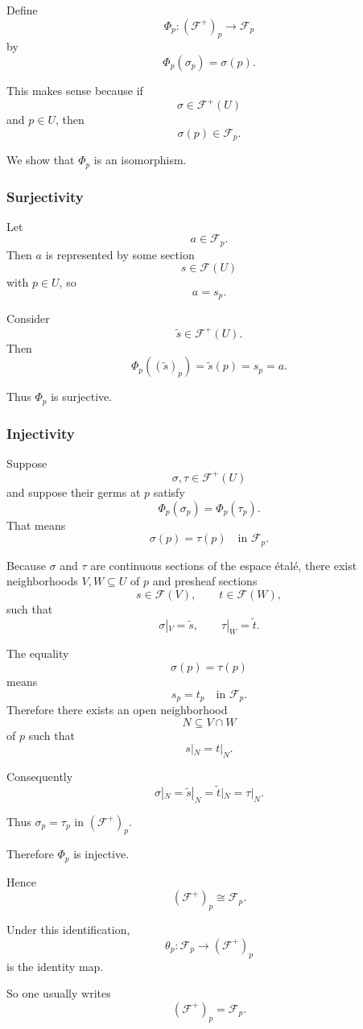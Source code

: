 \documentclass[12pt,a4paper]{article}
\begin{document}
Define
\[
\Phi_p : (\mathcal F^+)_p \longrightarrow \mathcal F_p
\]
by
\[
\Phi_p(\sigma_p) = \sigma(p).
\]

This makes sense because if
\[
\sigma \in \mathcal F^+(U)
\]
and $p \in U$, then
\[
\sigma(p) \in \mathcal F_p.
\]

We show that $\Phi_p$ is an isomorphism.

\subsubsection*{Surjectivity}

Let
\[
a \in \mathcal F_p.
\]
Then $a$ is represented by some section
\[
s \in \mathcal F(U)
\]
with $p \in U$, so
\[
a = s_p.
\]

Consider
\[
\widetilde{s} \in \mathcal F^+(U).
\]
Then
\[
\Phi_p((\widetilde{s})_p)
=
\widetilde{s}(p)
=
s_p
=
a.
\]

Thus $\Phi_p$ is surjective.

\subsubsection*{Injectivity}

Suppose
\[
\sigma,\tau \in \mathcal F^+(U)
\]
and suppose their germs at $p$ satisfy
\[
\Phi_p(\sigma_p) = \Phi_p(\tau_p).
\]
That means
\[
\sigma(p) = \tau(p)
\quad \text{in } \mathcal F_p.
\]

Because $\sigma$ and $\tau$ are continuous sections of the espace étalé,
there exist neighborhoods $V,W \subseteq U$ of $p$ and presheaf sections
\[
s \in \mathcal F(V),
\qquad
t \in \mathcal F(W),
\]
such that
\[
\sigma|_V = \widetilde{s},
\qquad
\tau|_W = \widetilde{t}.
\]

The equality
\[
\sigma(p)=\tau(p)
\]
means
\[
s_p = t_p
\quad \text{in } \mathcal F_p.
\]
Therefore there exists an open neighborhood
\[
N \subseteq V \cap W
\]
of $p$ such that
\[
s|_N = t|_N.
\]

Consequently
\[
\sigma|_N = \widetilde{s}|_N
=
\widetilde{t}|_N
=
\tau|_N.
\]

Thus $\sigma_p=\tau_p$ in $(\mathcal F^+)_p$.

Therefore $\Phi_p$ is injective.

Hence
\[
(\mathcal F^+)_p \cong \mathcal F_p.
\]

Under this identification,
\[
\theta_p : \mathcal F_p \longrightarrow (\mathcal F^+)_p
\]
is the identity map.

So one usually writes
\[
(\mathcal F^+)_p = \mathcal F_p.
\]
\end{document}
